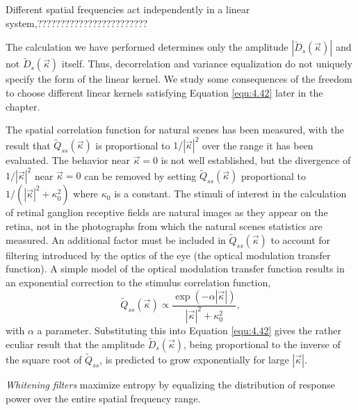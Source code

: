 \begin{rem}
  Different spatial frequencies act independently in a linear system,????????????????????????
\end{rem}

\begin{rem}
  The calculation we have performed determines only the amplitude $\left| \tilde{D}_s(\vec{\kappa}) \right|$
and not $\tilde{D}_s(\vec{\kappa})$ itself. Thus, decorrelation and variance equalization do
not uniquely specify the form of the linear kernel. We study some consequences of the freedom to choose different linear kernels satisfying Equation \ref{equ:4.42} later in the chapter.
\end{rem}

\begin{exm}
  The spatial correlation function for natural scenes has been measured,
 with the result that $\tilde{Q}_{ss}(\vec{\kappa})$ is proportional to $1/\left| \vec{\kappa} \right|^2$ over the range it has
 been evaluated. The behavior near $\vec{\kappa}=0$ is not well established, but the divergence of $1/\left| \vec{\kappa} \right|^2$  near $\vec{\kappa}=0$ can be removed by setting $\tilde{Q}_{ss}(\vec{\kappa})$ proportional to $1/(\left| \vec{\kappa} \right|^2+\kappa_0^{2})$  where $\kappa_0$ is a constant.
 The stimuli of interest in the calculation of retinal ganglion receptive fields are natural images as they appear on the retina, not in the photographs from which the natural scenes statistics are measured. An additional factor must be included in $\tilde{Q}_{ss}(\vec{\kappa})$ to account for filtering introduced by the optics of the eye (the optical modulation transfer function). A simple model of the optical modulation transfer function results in an exponential correction to the stimulus correlation function,
 \begin{equation}
   \label{equ:4.43}
   \tilde{Q}_{ss}(\vec{\kappa})\propto \frac{\exp(-\alpha\left| \vec{\kappa} \right|)}{\left| \vec{\kappa} \right|^2+\kappa_0^{2}},
 \end{equation}
with $\alpha$ a parameter. Substituting this into Equation \ref{equ:4.42} gives the rather
eculiar result that the amplitude  $\tilde{D}_s(\vec{\kappa})$, being proportional to the inverse of the square root of $ \tilde{Q}_{ss}$, is predicted to grow exponentially for large $\left| \vec{\kappa} \right|$.
\end{exm}

\begin{thm}
  \emph{Whitening filters} maximize entropy by equalizing the distribution of
response power over the entire spatial frequency range.
\end{thm}


